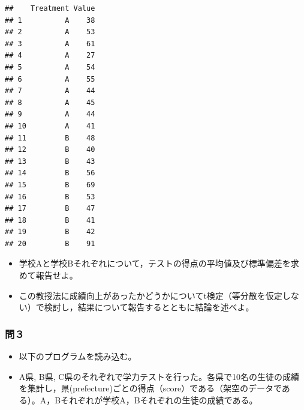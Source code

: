 \documentclass[]{article}
\providecommand{\tightlist}{%
  \setlength{\itemsep}{0pt}\setlength{\parskip}{0pt}}
\begin{document}
\begin{verbatim}
##    Treatment Value
## 1          A    38
## 2          A    53
## 3          A    61
## 4          A    27
## 5          A    54
## 6          A    55
## 7          A    44
## 8          A    45
## 9          A    44
## 10         A    41
## 11         B    48
## 12         B    40
## 13         B    43
## 14         B    56
## 15         B    69
## 16         B    53
## 17         B    47
## 18         B    41
## 19         B    42
## 20         B    91
\end{verbatim}

\begin{itemize}
\tightlist
\item
  学校Aと学校Bそれぞれについて，テストの得点の平均値及び標準偏差を求めて報告せよ。\\
\item
  この教授法に成績向上があったかどうかについてt検定（等分散を仮定しない）で検討し，結果について報告するとともに結論を述べよ。
\end{itemize}

\subsubsection{問３}\label{-14}

\begin{itemize}
\item
  以下のプログラムを読み込む。
\item
  A県, B県,
  C県のそれぞれで学力テストを行った。各県で10名の生徒の成績を集計し，県(prefecture)ごとの得点（score）である（架空のデータである）。A，Bそれぞれが学校A，Bそれぞれの生徒の成績である。
\end{itemize}
\end{document}
